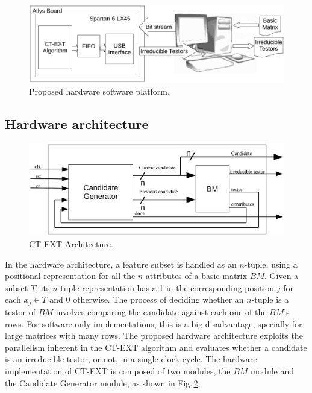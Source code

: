 \documentclass[authoryear,preprint,review,12pt]{elsarticle}
\begin{document}
\begin{figure}[htb]
    \begin{center}
       \includegraphics[width=13cm]{Arquitecture.eps}
    \end{center}
\caption{Proposed hardware software platform.}
\label{figArq}
\end{figure}

\subsection{Hardware architecture}
\label{sect:4}

\begin{figure}[htb]
    \begin{center}
        \includegraphics[width=13cm]{CT-ext_arq.eps}
    \end{center}
\caption{CT-EXT Architecture.}
\label{fig:3}
\end{figure}

In the hardware architecture, a feature subset is handled as an $n$-tuple, using a positional 
representation for all the $n$ attributes of a basic matrix $BM$. Given a subset $T$, its $n$-tuple representation 
has a 1 in the corresponding position $j$ for each $x_j \in T$ and 0 otherwise.
The process of deciding whether an $n$-tuple is a testor of $BM$ involves
comparing the candidate against each one of the $BM$'s rows. For
software-only implementations, this is a big disadvantage, specially for large 
matrices with many rows. The proposed hardware architecture exploits the parallelism 
inherent in the CT-EXT algorithm
and evaluates whether a candidate is an irreducible testor, or not, in a single
clock cycle. The hardware implementation of CT-EXT is composed of two modules, the $BM$ module and the Candidate Generator module, as shown in
Fig.\,\ref{fig:3}. 
\end{document}
